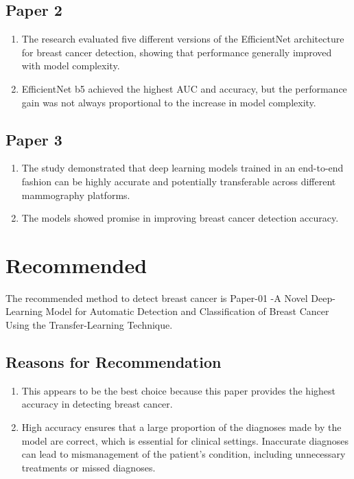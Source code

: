 \documentclass[12]{article}
\begin{document}
\subsection{Paper 2}
\begin{enumerate}
    \item The research evaluated five different versions of the EfficientNet architecture for breast cancer detection, showing that performance generally improved with model complexity.
    \item EfficientNet b5 achieved the highest AUC and accuracy, but the performance gain was not always proportional to the increase in model complexity.
\end{enumerate}

\subsection{Paper 3}
\begin{enumerate}
    \item The study demonstrated that deep learning models trained in an end-to-end fashion can be highly accurate and potentially transferable across different mammography platforms.
    \item The models showed promise in improving breast cancer detection accuracy.
\end{enumerate}

\section{Recommended}
The recommended method to detect breast cancer is Paper-01 -A Novel Deep-Learning Model for Automatic Detection and Classification of Breast Cancer Using the Transfer-Learning Technique.
\subsection{Reasons for Recommendation}
\begin{enumerate}
    \item This appears to be the best choice because this paper provides the highest accuracy in detecting breast cancer.
    \item High accuracy ensures that a large proportion of the diagnoses made by the model are correct, which is essential for clinical settings. Inaccurate diagnoses can lead to mismanagement of the patient's condition, including unnecessary treatments or missed diagnoses.
\end{enumerate}
\end{document}

